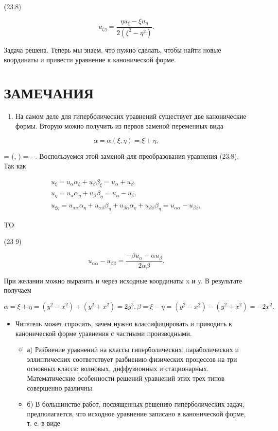 \documentclass[
  ukrainian,
]{article}
\providecommand{\tightlist}{%
  \setlength{\itemsep}{0pt}\setlength{\parskip}{0pt}}
\begin{document}
(23.8)

\[
u_{\xi\eta} = \frac{\eta u_{\xi} - \xi u_{\eta}}{2(\xi^2 - \eta^2)}.
\]

Задача решена. Теперь мы знаем, что нужно сделать, чтобы найти новые
координаты и привести уравнение к канонической форме.

\section{ЗАМЕЧАНИЯ}\label{ux437ux430ux43cux435ux447ux430ux43dux438ux44f-9}

\begin{enumerate}
\def\labelenumi{\arabic{enumi}.}
\tightlist
\item
  На самом деле для гиперболических уравнений существует две
  канонические формы. Вторую можно получить из первов заменой переменных
  вида
\end{enumerate}

\[
\alpha = \alpha (\xi, \eta) = \xi + \eta,
\]

\beta = \beta (\xi, \eta) = \xi - \eta. Воспользуемся этой заменой для
преобразования уравнения (23.8). Так как

\[
\begin{array}{l} u_{\xi} = u_{\alpha}\alpha_{\xi} + u_{\beta}\beta_{\xi} = u_{\alpha} + u_{\beta}. \\ u_{\eta} = u_{\alpha}\alpha_{\eta} + u_{\beta}\beta_{\eta} = u_{\alpha} - u_{\beta}, \\ u_{\xi\eta} = u_{\alpha\alpha}\alpha_{\eta} + u_{\alpha\beta}\beta_{\eta} + u_{\beta\alpha}\alpha_{\eta} + u_{\beta\beta}\beta_{\eta} = u_{\alpha\alpha} - u_{\beta\beta}, \end{array}
\]

TO

(23 9)

\[
u_{\alpha\alpha} - u_{\beta\beta} = \frac{-\beta u_{\alpha} - \alpha u_{\beta}}{2\alpha\beta}.
\]

При желании можно выразить \alpha   и \beta   через исходные координаты
x и y. В результате получаем

\[
\alpha = \xi + \eta = (y^2 - x^2) + (y^2 + x^2) = 2y^3,
\beta = \xi - \eta = (y^2 - x^2) - (y^2 + x^2) = -2x^2.
\]

\begin{itemize}
\tightlist
\item
  Читатель может спросить, зачем нужно классифицировать и приводить к
  канонической форме уравнения с частными производными.

  \begin{itemize}
  \tightlist
  \item
    а) Разбиение уравнений на классы гиперболических, параболических и
    эллиптических соответствует разбиению физических процессов на три
    основных класса: волновых, диффузионных и стационарных.
    Математические особенности решений уравнений этих трех типов
    совершенно различны.
  \item
    б) В большинстве работ, посвященных решению гиперболических задач,
    предполагается, что исходное уравнение записано в канонической
    форме, т. е. в виде
  \end{itemize}
\end{itemize}
\end{document}
